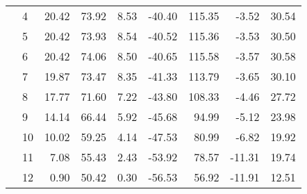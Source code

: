 \begin{table}
\begin{tabular}{l|l|rrrrrrr}
 & 4 & 20.42 & 73.92 & 8.53 & -40.40 & 115.35 & -3.52 & 30.54 \\
 & 5 & 20.42 & 73.93 & 8.54 & -40.52 & 115.36 & -3.53 & 30.50 \\
 & 6 & 20.42 & 74.06 & 8.50 & -40.65 & 115.58 & -3.57 & 30.58 \\
 & 7 & 19.87 & 73.47 & 8.35 & -41.33 & 113.79 & -3.65 & 30.10 \\
 & 8 & 17.77 & 71.60 & 7.22 & -43.80 & 108.33 & -4.46 & 27.72 \\
 & 9 & 14.14 & 66.44 & 5.92 & -45.68 & 94.99 & -5.12 & 23.98 \\
 & 10 & 10.02 & 59.25 & 4.14 & -47.53 & 80.99 & -6.82 & 19.92 \\
 & 11 & 7.08 & 55.43 & 2.43 & -53.92 & 78.57 & -11.31 & 19.74 \\
 & 12 & 0.90 & 50.42 & 0.30 & -56.53 & 56.92 & -11.91 & 12.51 \\
\cline{1-9}
\bottomrule
\end{tabular}
\end{table}

